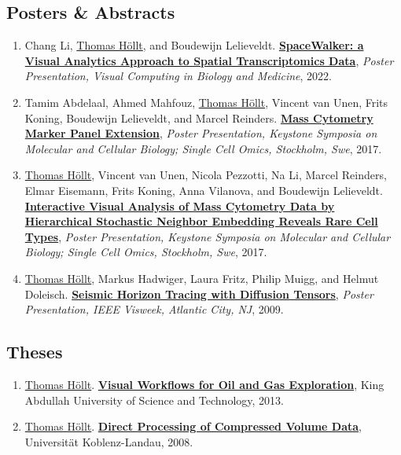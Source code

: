 \documentclass[10pt,a4paper,roman,final]{moderncv}
\newcommand*\highlightauthor[1]{\underline{#1}}
\begin{document}
\subsection*{Posters \& Abstracts}
\begin{enumerate}[leftmargin=0cm,start=76]
\item
Chang Li, \highlightauthor{Thomas Höllt}, and Boudewijn Lelieveldt.
\href{https://www.thomashollt.com/publications/2022_vcbm_chang/}{\textbf{SpaceWalker: a Visual Analytics Approach to Spatial Transcriptomics Data}},
\emph{Poster Presentation, Visual Computing in Biology and Medicine},
2022.


\item
Tamim Abdelaal, Ahmed Mahfouz, \highlightauthor{Thomas Höllt}, Vincent van Unen, Frits Koning, Boudewijn Lelieveldt, and Marcel Reinders.
\href{https://www.thomashollt.com/publications/2017_ksomics_tamim/}{\textbf{Mass Cytometry Marker Panel Extension}},
\emph{Poster Presentation, Keystone Symposia on Molecular and Cellular Biology; Single Cell Omics, Stockholm, Swe},
2017.


\item
\highlightauthor{Thomas Höllt}, Vincent van Unen, Nicola Pezzotti, Na Li, Marcel Reinders, Elmar Eisemann, Frits Koning, Anna Vilanova, and Boudewijn Lelieveldt.
\href{https://www.thomashollt.com/publications/2017_ksomics/}{\textbf{Interactive Visual Analysis of Mass Cytometry Data by Hierarchical Stochastic Neighbor Embedding Reveals Rare Cell Types}},
\emph{Poster Presentation, Keystone Symposia on Molecular and Cellular Biology; Single Cell Omics, Stockholm, Swe},
2017.


\item
\highlightauthor{Thomas Höllt}, Markus Hadwiger, Laura Fritz, Philip Muigg, and Helmut Doleisch.
\href{https://www.thomashollt.com/publications/2009_vis/}{\textbf{Seismic Horizon Tracing with Diffusion Tensors}},
\emph{Poster Presentation, IEEE Visweek, Atlantic City, NJ},
2009.


\end{enumerate}

\subsection*{Theses}
\begin{enumerate}[leftmargin=0cm,start=80]
\item
\highlightauthor{Thomas Höllt}.
\href{https://www.thomashollt.com/publications/2013_phd_thesis/}{\textbf{Visual Workflows for Oil and Gas Exploration}},
King Abdullah University of Science and Technology,
2013.


\item
\highlightauthor{Thomas Höllt}.
\href{https://www.thomashollt.com/publications/2008_msc_thesis/}{\textbf{Direct Processing of Compressed Volume Data}},
Universität Koblenz-Landau,
2008.


\end{enumerate}
\end{document}
